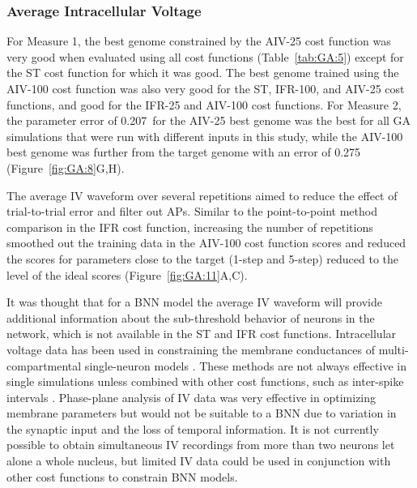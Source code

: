 \subsubsection{Average Intracellular Voltage}\label{sec:GA:aver-intr-volt-summ}

For Measure 1, the best genome constrained by the AIV-25 cost function was very
good when evaluated using all cost functions (Table~\ref{tab:GA:5}) except for the
ST cost function for which it was good. The best genome trained using the
AIV-100 cost function was also very good for the ST, IFR-100, and AIV-25 cost
functions, and good for the IFR-25 and AIV-100 cost
functions.  %
For Measure 2, the parameter error of 0.207~for the AIV-25 best genome was the
best for all GA simulations that were run with different inputs in this study,
while the AIV-100 best genome was further from the target genome with an error
of 0.275 (Figure~\ref{fig:GA:8}G,H).

\smallskip{}

The average IV waveform over several repetitions aimed to reduce the effect of
trial-to-trial error and filter out APs.  Similar to the point-to-point method
comparison in the IFR cost function, increasing the number of repetitions
smoothed out the training data in the AIV-100 cost function scores and reduced
the scores for parameters close to the target (1-step and 5-step) reduced to the
level of the ideal scores (Figure~\ref{fig:GA:11}A,C).

\smallskip{}

It was thought that for a BNN model the average IV waveform will provide
additional information about the sub-threshold behavior of neurons in the
network, which is not available in the ST and IFR cost functions.  Intracellular
voltage data has been used in constraining the membrane conductances of
multi-compartmental single-neuron models \cite{Le_Masson:2000,KerenPeledEtAl:2005}.
These methods are not always effective in single simulations unless combined
with other cost functions, such as inter-spike intervals
\citep{KerenPeledEtAl:2005}. Phase-plane analysis of IV data was very effective
in optimizing membrane parameters \citep{VanDeEtAl:2008,KerenPeledEtAl:2005} but would not
be suitable to a BNN due to variation in the synaptic input and the loss of
temporal information.  It is not currently possible to obtain simultaneous IV
recordings from more than two neurons let alone a whole nucleus, but limited IV
data could be used in conjunction with other cost functions to constrain BNN
models.

